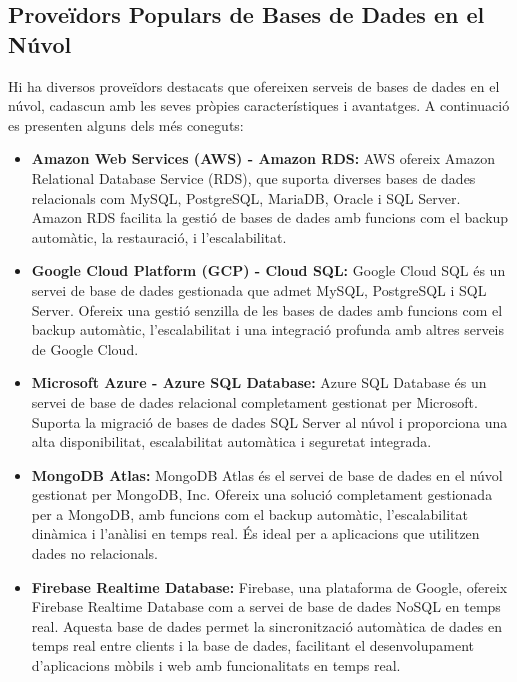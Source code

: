 \documentclass[a4paper,12pt,twoside]{ThesisStyle}
\begin{document}
\subsection{Proveïdors Populars de Bases de Dades en el Núvol}
\label{subsec:Proveïdors Populars de Bases de Dades en el Núvol}

Hi ha diversos proveïdors destacats que ofereixen serveis de bases de dades en el núvol, cadascun amb les seves pròpies característiques i avantatges. A continuació es presenten alguns dels més coneguts:

\begin{itemize}
    \item \textbf{Amazon Web Services (AWS) - Amazon RDS:}
    AWS ofereix Amazon Relational Database Service (RDS), que suporta diverses bases de dades relacionals com MySQL, PostgreSQL, MariaDB, Oracle i SQL Server. Amazon RDS facilita la gestió de bases de dades amb funcions com el backup automàtic, la restauració, i l'escalabilitat.
    
    \item \textbf{Google Cloud Platform (GCP) - Cloud SQL:}
    Google Cloud SQL és un servei de base de dades gestionada que admet MySQL, PostgreSQL i SQL Server. Ofereix una gestió senzilla de les bases de dades amb funcions com el backup automàtic, l'escalabilitat i una integració profunda amb altres serveis de Google Cloud.
    
    \item \textbf{Microsoft Azure - Azure SQL Database:}
    Azure SQL Database és un servei de base de dades relacional completament gestionat per Microsoft. Suporta la migració de bases de dades SQL Server al núvol i proporciona una alta disponibilitat, escalabilitat automàtica i seguretat integrada.
    
    \item \textbf{MongoDB Atlas:}
    MongoDB Atlas és el servei de base de dades en el núvol gestionat per MongoDB, Inc. Ofereix una solució completament gestionada per a MongoDB, amb funcions com el backup automàtic, l'escalabilitat dinàmica i l'anàlisi en temps real. És ideal per a aplicacions que utilitzen dades no relacionals.
    
    \item \textbf{Firebase Realtime Database:}
    Firebase, una plataforma de Google, ofereix Firebase Realtime Database com a servei de base de dades NoSQL en temps real. Aquesta base de dades permet la sincronització automàtica de dades en temps real entre clients i la base de dades, facilitant el desenvolupament d'aplicacions mòbils i web amb funcionalitats en temps real.
\end{itemize}
\end{document}
